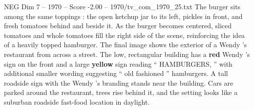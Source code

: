 \begin{textsample}{NEG Dim 7 – 1970 – Score -2.00 – 1970/tv\_com\_1970\_25.txt}
The burger sits among the same toppings : the open ketchup jar to its left, pickles in front, and fresh tomatoes behind and beside it.
As the burger becomes centered, sliced tomatoes and whole tomatoes fill the right side of the scene, reinforcing the idea of a heavily topped hamburger.
The final image shows the exterior of a Wendy ’s restaurant from across a street.
The low, rectangular building has a \textbf{red} Wendy ’s sign on the front and a large \textbf{yellow} sign reading “ HAMBURGERS, ” with additional smaller wording suggesting “ old fashioned ” hamburgers.
A tall roadside sign with the Wendy ’s branding stands near the building.
Cars are parked around the restaurant, trees rise behind it, and the setting looks like a suburban roadside fast-food location in daylight.

\end{textsample}
